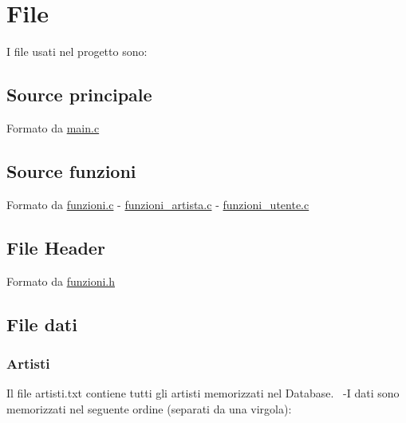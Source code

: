\hypertarget{index_file_sec}{}\section{File}\label{index_file_sec}
I file usati nel progetto sono\+: \hypertarget{index_file1}{}\subsection{Source principale}\label{index_file1}
Formato da \hyperlink{main_8c}{main.\+c} \hypertarget{index_file2}{}\subsection{Source funzioni}\label{index_file2}
Formato da \hyperlink{funzioni_8c}{funzioni.\+c} -\/ \hyperlink{funzioni__artista_8c}{funzioni\+\_\+artista.\+c} -\/ \hyperlink{funzioni__utente_8c}{funzioni\+\_\+utente.\+c} \hypertarget{index_file3}{}\subsection{File Header}\label{index_file3}
Formato da \hyperlink{funzioni_8h}{funzioni.\+h} \hypertarget{index_file4-5-6}{}\subsection{File dati}\label{index_file4-5-6}
\hypertarget{index_artisti}{}\subsubsection{Artisti}\label{index_artisti}
Il file artisti.\+txt contiene tutti gli artisti memorizzati nel Database.~\newline
 -\/I dati sono memorizzati nel seguente ordine (separati da una virgola)\+:
